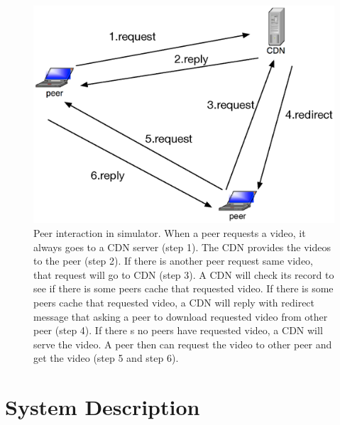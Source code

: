 \documentclass[10pt,final,journal,a4paper]{IEEEtran}
\begin{document}

\begin{figure}[!t]
\begin{center}
\includegraphics[scale=0.4]{graphs/p2p-system-description.eps}
\end{center}
\caption{Peer interaction in simulator.
When a peer requests a video, it always goes to a CDN server (step 1). 
The CDN provides the videos to the peer (step 2). 
If there is another peer request same video, that request will go to CDN (step 3).  
A CDN will check its record to see if there is some peers cache that requested video.  
If there is some peers cache that requested video, a CDN will reply with redirect message that asking a peer to download requested video from other peer (step 4).
If there s no peers have requested video, a CDN will serve the video.   
A peer then can request the video to other peer and get the video (step 5 and step 6).
}
\label{fig:p2pcdninteractioninsimulator}
\end{figure} 



\section{System Description}\label{systemdescription}
\end{document}
